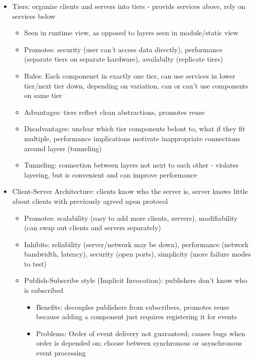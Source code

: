 \documentclass[10pt,letterpaper,unboxed,cm]{article}
\begin{document}
\begin{itemize}
    \item Tiers: organize clients and servers into tiers - provide services above, rely on services below
    \begin{itemize}
        \item Seen in runtime view, as opposed to layers seen in module/static view
        \item Promotes: security (user can't access data directly), performance (separate tiers on separate hardware), availabilty (replicate tiers)
        \item Rules: Each componenet in exactly one tier, can use services in lower tier/next tier down, depending on variation, can or can't use components on same tier
        \item Advantages: tiers reflect clean abstractions, promotes reuse
        \item Disadvantages: unclear which tier components belont to, what if they fit multiple, performance implications motivate inappropriate connections around layers (tunneling)
        \item Tunneling: connection between layers not next to each other - violates layering, but is convenient and can improve performance
    \end{itemize}
    \item Client-Server Architecture: clients know who the server is, server knows little about clients with previously agreed upon protocol
    \begin{itemize}
        \item Promotes: scalability (easy to add more clients, servers), modifiability (can swap out clients and servers separately)
        \item Inhibits: reliability (server/network may be down), performance (network bandwidth, latency), security (open ports), simplicity (more failure modes to test)
        \item Publish-Subscribe style (Implicit Invocation): publishers don't know who is subscribed
        \begin{itemize}
            \item Benefits: decouples publishers from subscribers, promotes reuse because adding a component just requires registering it for events
            \item Problems: Order of event delivery not guaranteed; causes bugs when order is depended on; choose between synchronous or asynchronous event processing
        \end{itemize}
    \end{itemize}
\end{itemize}
\end{document}
